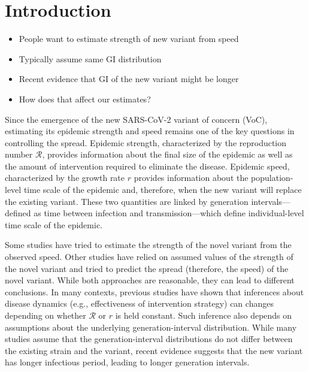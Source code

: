 \documentclass[12pt]{article}
\date{\today}
\newcommand{\RR}{\ensuremath{{\mathcal R}}\xspace}
\begin{document}
\begin{flushleft}{
	\Large
	\textbf{}
}
\end{flushleft}

\section{Introduction}

\begin{itemize}
  \item People want to estimate strength of new variant from speed
  \item Typically assume same GI distribution
  \item Recent evidence that GI of the new variant might be longer
  \item How does that affect our estimates?
\end{itemize}

Since the emergence of the new SARS-CoV-2 variant of concern (VoC), estimating its epidemic strength and speed remains one of the key questions in controlling the spread.
Epidemic strength, characterized by the reproduction number $\RR$, provides information about the final size of the epidemic as well as the amount of intervention required to eliminate the disease.
Epidemic speed, characterized by the growth rate $r$ provides information about the population-level time scale of the epidemic and, therefore, when the new variant will replace the existing variant.
These two quantities are linked by generation intervals---defined as time between infection and transmission---which define individual-level time scale of the epidemic.

Some studies have tried to estimate the strength of the novel variant from the observed speed.
Other studies have relied on assumed values of the strength of the novel variant and tried to predict the spread (therefore, the speed) of the novel variant.
While both approaches are reasonable, they can lead to different conclusions.
In many contexts, previous studies have shown that inferences about disease dynamics (e.g., effectiveness of intervention strategy) can changes depending on whether $\RR$ or $r$ is held constant.
Such inference also depends on assumptions about the underlying generation-interval distribution.
While many studies assume that the generation-interval distributions do not differ between the existing strain and the variant, recent evidence suggests that the new variant has longer infectious period, leading to longer generation intervals.
\end{document}
